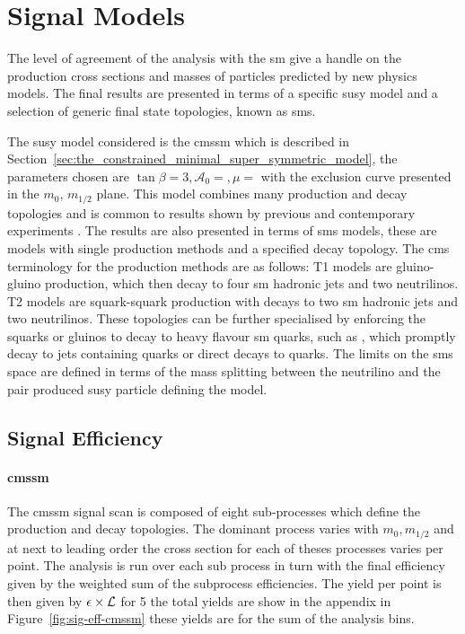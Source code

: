 \section{Signal Models} %
\label{sec:signal_models}
The level of agreement of the analysis with the \ac{sm} give a handle on the 
production cross sections and masses of particles predicted by new physics 
models. The final results are presented in terms of a specific \ac{susy} model 
and a selection of generic final state topologies, known as \ac{sms}.

The \ac{susy} model considered is the \ac{cmssm}\cite{} which is described 
in Section~\ref{sec:the_constrained_minimal_super_symmetric_model}, the 
parameters chosen are $\tan\beta =3, \mathcal{A}_{0} = , \mu = $ with the 
exclusion curve presented in the $m_{0}$, $m_{1/2}$ plane. This model combines 
many production and decay topologies and is common to results shown by previous 
and contemporary experiments \cite{} .
The results are also presented in terms of \ac{sms}\cite{} models, these are 
models with single production methods and a specified decay topology. The 
\ac{cms} terminology for the production methods are as follows: T1 models are 
gluino-gluino production, which then decay to four \ac{sm} hadronic jets and 
two neutrilinos. T2 models are squark-squark production with decays to two 
\ac{sm} hadronic jets and two neutrilinos.
These topologies can be further specialised by enforcing the squarks or gluinos 
to decay to heavy flavour \ac{sm} quarks, such as \Ptop, which promptly decay 
to jets containing \Pbottom quarks or direct decays to \Pbottom quarks. The 
limits on the \ac{sms} space are defined in terms of the mass splitting between 
the neutrilino and the pair produced \ac{susy} particle defining the model.
\subsection{Signal Efficiency} %
\label{sub:signal_efficiency}
\paragraph{\ac{cmssm}} %
\label{par:cmssm}
The \ac{cmssm} signal scan is composed of eight sub-processes which define the 
production and decay topologies. The dominant process varies with $m_{0}, 
m_{1/2}$ and at next to leading order the cross section for each of theses 
processes varies per point. The analysis is run over each sub process in turn 
with the final efficiency given by the weighted sum of the subprocess 
efficiencies. The yield per point is then given by 
$\epsilon\time\sigma\times\mathcal{L}$ for \unit{5}{\invfb} the total yields 
are show in the appendix in Figure~\ref{fig:sig-eff-cmssm} these yields are for 
the sum of the \HT analysis bins.

